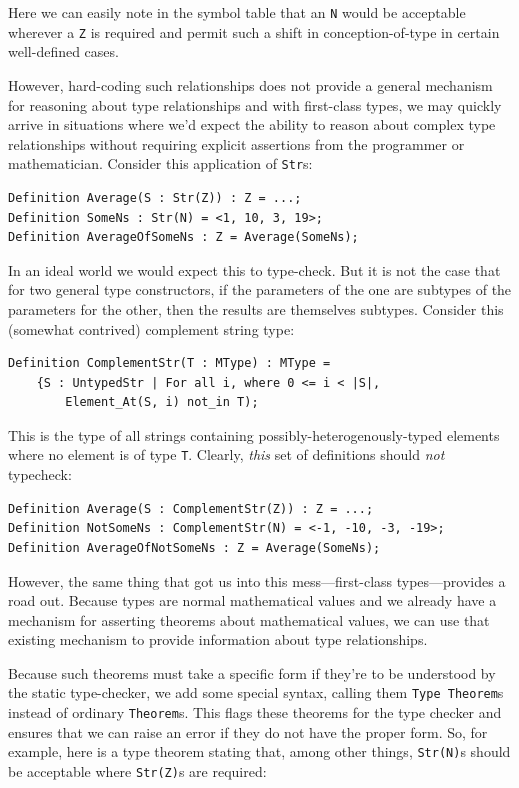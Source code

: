 Here we can easily note in the symbol table that an \texttt{N} would be acceptable wherever a \texttt{Z} is required and permit such a shift in conception-of-type in certain well-defined cases.

However, hard-coding such relationships does not provide a general mechanism for reasoning about type relationships and with first-class types, we may quickly arrive in situations where we'd expect the ability to reason about complex type relationships without requiring explicit assertions from the programmer or mathematician.  Consider this application of \texttt{Str}s:

\begin{lstlisting}
Definition Average(S : Str(Z)) : Z = ...;
Definition SomeNs : Str(N) = <1, 10, 3, 19>;
Definition AverageOfSomeNs : Z = Average(SomeNs);
\end{lstlisting}

In an ideal world we would expect this to type-check.  But it is not the case that for two general type constructors, if the parameters of the one are subtypes of the parameters for the other, then the results are themselves subtypes.  Consider this (somewhat contrived) complement string type:

\begin{lstlisting}
Definition ComplementStr(T : MType) : MType = 
	{S : UntypedStr | For all i, where 0 <= i < |S|,
		Element_At(S, i) not_in T);
\end{lstlisting}

This is the type of all strings containing possibly-heterogenously-typed elements where no element is of type \texttt{T}.  Clearly, \emph{this} set of definitions should \emph{not} typecheck:

\begin{lstlisting}
Definition Average(S : ComplementStr(Z)) : Z = ...;
Definition NotSomeNs : ComplementStr(N) = <-1, -10, -3, -19>;
Definition AverageOfNotSomeNs : Z = Average(SomeNs);
\end{lstlisting}

However, the same thing that got us into this mess---first-class types---provides a road out.  Because types are normal mathematical values and we already have a mechanism for asserting theorems about mathematical values, we can use that existing mechanism to provide information about type relationships.

Because such theorems must take a specific form if they're to be understood by the static type-checker, we add some special syntax, calling them \texttt{Type Theorem}s instead of ordinary \texttt{Theorem}s.  This flags these theorems for the type checker and ensures that we can raise an error if they do not have the proper form.  So, for example, here is a type theorem stating that, among other things, \texttt{Str(N)}s should be acceptable where \texttt{Str(Z)}s are required:


